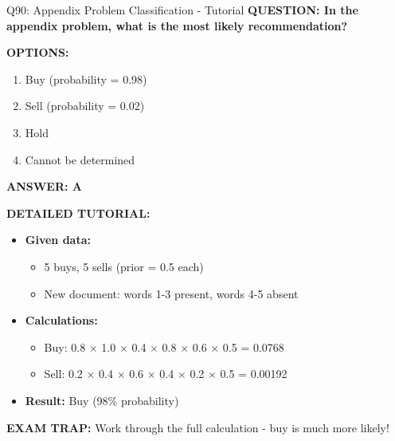 \documentclass[8pt]{beamer}
\begin{document}
	\begin{frame}{Q90: Appendix Problem Classification - Tutorial}
		\fontsize{6.5}{7.5}\selectfont
		\textbf{QUESTION: In the appendix problem, what is the most likely recommendation?}
		
		\vspace{0.1cm}
		\textbf{OPTIONS:}
		\begin{enumerate}
			\item Buy (probability = 0.98)
			\item Sell (probability = 0.02)
			\item Hold
			\item Cannot be determined
		\end{enumerate}
		
		\vspace{0.1cm}
		\textcolor{myblue}{\textbf{ANSWER: A}}
		
		\vspace{0.1cm}
		\textbf{DETAILED TUTORIAL:}
		\begin{itemize}
			\item \textbf{Given data:}
			\begin{itemize}
				\item 5 buys, 5 sells (prior = 0.5 each)
				\item New document: words 1-3 present, words 4-5 absent
			\end{itemize}
			\item \textbf{Calculations:}
			\begin{itemize}
				\item Buy: 0.8 $\times$ 1.0 $\times$ 0.4 $\times$ 0.8 $\times$ 0.6 $\times$ 0.5 = 0.0768
				\item Sell: 0.2 $\times$ 0.4 $\times$ 0.6 $\times$ 0.4 $\times$ 0.2 $\times$ 0.5 = 0.00192
			\end{itemize}
			\item \textbf{Result:} Buy (98\% probability)
		\end{itemize}
		
		\textcolor{myred}{\textbf{EXAM TRAP:}} Work through the full calculation - \textcolor{myblue}{buy is much more likely}!
	\end{frame}
	
\end{document}
